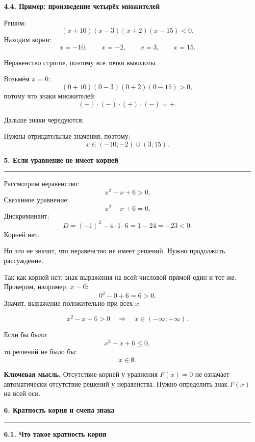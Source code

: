 \documentclass[a4paper,12pt]{article}
\newcommand{\sectiontitle}[1]{%
  \vspace{0.6em}
  {\Large\bfseries\textcolor{darkaccent}{#1}}\par
  \vspace{0.25em}
  {\color{accent}\rule{\linewidth}{0.5pt}}
  \vspace{0.4em}
}
\newcommand{\subsectiontitle}[1]{%
  \vspace{0.5em}
  {\large\bfseries\textcolor{darkaccent}{#1}}\par
  \vspace{0.15em}
}
\newcommand{\important}[1]{\textbf{\textcolor{darkaccent}{#1}}}
\newcommand{\openpoint}[2]{\draw[accent, line width=0.8pt, fill=white] (#1,0) circle (2.2pt) node[below=6pt, text=black] {$#2$};}
\begin{document}
\subsectiontitle{4.4. Пример: произведение четырёх множителей}

Решим:
\[
(x+10)(x-3)(x+2)(x-15)<0.
\]
Находим корни:
\[
x=-10,\qquad x=-2,\qquad x=3,\qquad x=15.
\]

Неравенство строгое, поэтому все точки выколоты.

Возьмём $x=0$:
\[
(0+10)(0-3)(0+2)(0-15)>0,
\]
потому что знаки множителей:
\[
(+)\cdot(-)\cdot(+)\cdot(-)=+.
\]

Дальше знаки чередуются:

\begin{center}
\end{center}

Нужны отрицательные значения, поэтому:
\[
x\in(-10;-2)\cup(3;15).
\]

\sectiontitle{5. Если уравнение не имеет корней}

Рассмотрим неравенство:
\[
x^2-x+6>0.
\]
Связанное уравнение:
\[
x^2-x+6=0.
\]
Дискриминант:
\[
D=(-1)^2-4\cdot1\cdot6=1-24=-23<0.
\]
Корней нет.

Но это не значит, что неравенство не имеет решений. Нужно продолжить рассуждение.

Так как корней нет, знак выражения на всей числовой прямой один и тот же. Проверим, например, $x=0$:
\[
0^2-0+6=6>0.
\]
Значит, выражение положительно при всех $x$.

\[
x^2-x+6>0
\quad\Rightarrow\quad
x\in(-\infty;+\infty).
\]

Если бы было:
\[
x^2-x+6\le 0,
\]
то решений не было бы:
\[
x\in\emptyset.
\]

\important{Ключевая мысль.}
Отсутствие корней у уравнения $F(x)=0$ не означает автоматически отсутствие решений у неравенства. Нужно определить знак $F(x)$ на всей оси.

\sectiontitle{6. Кратность корня и смена знака}

\subsectiontitle{6.1. Что такое кратность корня}
\end{document}

